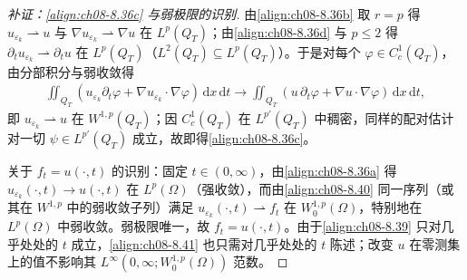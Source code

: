 \documentclass[../../main.tex]{subfiles}%
\begin{document}
\begin{proof}[补证：\eqref{align:ch08-8.36c} 与弱极限的识别]
由\eqref{align:ch08-8.36b} 取 $r=p$ 得 $u_{\varepsilon_k}\rightharpoonup u$ 与 $\nabla u_{\varepsilon_k}\rightharpoonup\nabla u$ 在 $L^p(Q_T)$；由\eqref{align:ch08-8.36d} 与 $p\leqslant2$ 得 $\partial_tu_{\varepsilon_k}\rightharpoonup\partial_tu$ 在 $L^p(Q_T)$（$L^2(Q_T)\subseteq L^p(Q_T)$）。于是对每个 $\varphi\in C^1_c(Q_T)$，由分部积分与弱收敛得
\begin{align*}
\iint_{Q_T}(u_{\varepsilon_k}\partial_t\varphi+\nabla u_{\varepsilon_k}\cdot\nabla\varphi)\,\mathrm{d}x\,\mathrm{d}t
\to\iint_{Q_T}(u\,\partial_t\varphi+\nabla u\cdot\nabla\varphi)\,\mathrm{d}x\,\mathrm{d}t,
\end{align*}
即 $u_{\varepsilon_k}\rightharpoonup u$ 在 $W^{1,p}(Q_T)$；因 $C^1_c(Q_T)$ 在 $L^{p'}(Q_T)$ 中稠密，同样的配对估计对一切 $\psi\in L^{p'}(Q_T)$ 成立，故即得\eqref{align:ch08-8.36c}。

关于 $f_t=u(\cdot,t)$ 的识别：固定 $t\in(0,\infty)$，由\eqref{align:ch08-8.36a} 得 $u_{\varepsilon_k}(\cdot,t)\to u(\cdot,t)$ 在 $L^p(\Omega)$（强收敛），而由\eqref{align:ch08-8.40} 同一序列（或其在 $W^{1,p}$ 中的弱收敛子列）满足 $u_{\varepsilon_k}(\cdot,t)\rightharpoonup f_t$ 在 $W^{1,p}_0(\Omega)$，特别地在 $L^p(\Omega)$ 中弱收敛。弱极限唯一，故 $f_t=u(\cdot,t)$。由于\eqref{align:ch08-8.39} 只对几乎处处的 $t$ 成立，\eqref{align:ch08-8.41} 也只需对几乎处处的 $t$ 陈述；改变 $u$ 在零测集上的值不影响其 $L^\infty(0,\infty;W^{1,p}_0(\Omega))$ 范数。
\end{proof}
\end{document}
